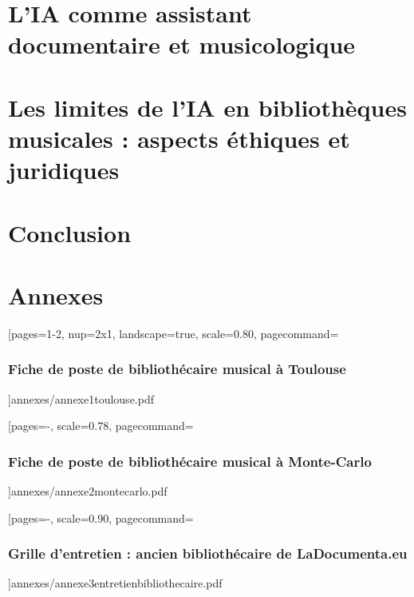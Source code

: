 \documentclass[12pt,twoside]{book}
\begin{document}
	\chapter{L'IA comme assistant documentaire et musicologique}

	
	\chapter{Les limites de l'IA en bibliothèques musicales : aspects éthiques et juridiques }

	
	\chapter*{Conclusion}
	\newpage{\pagestyle{empty}\cleardoublepage}
	
	
	
	

	
	
	
\appendix %

\chapter*{Annexes} %



[pages=1-2, 
nup=2x1, 
landscape=true, 
scale=0.80, 
pagecommand={\subsection*{Fiche de poste de bibliothécaire musical à Toulouse}}]{annexes/annexe1toulouse.pdf}



[pages={-},
scale=0.78,
pagecommand=\subsection*{Fiche de poste de bibliothécaire musical à Monte-Carlo}]{annexes/annexe2montecarlo.pdf}



[pages={-},
scale=0.90,
pagecommand={\subsection*{Grille d'entretien : ancien bibliothécaire de LaDocumenta.eu}}]{annexes/annexe3entretienbibliothecaire.pdf}
\end{document}
